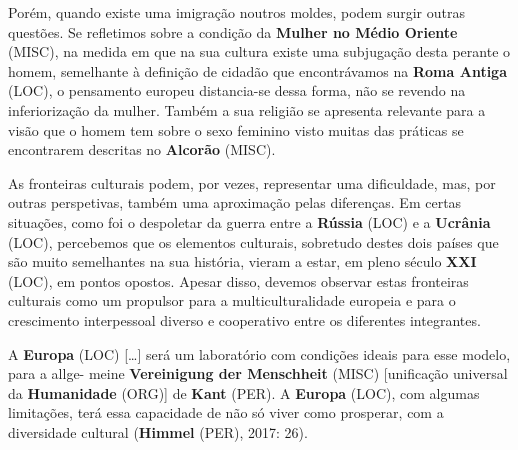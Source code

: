 \documentclass[12pt,a4paper]{article}
\begin{document}
Porém,  quando  existe  uma  imigração  noutros  moldes,  podem  surgir  outras questões. Se refletimos sobre a condição da \textbf{Mulher no Médio Oriente} (MISC), na medida em que na sua cultura existe uma subjugação desta perante o homem, semelhante à definição de cidadão que encontrávamos na \textbf{Roma Antiga} (LOC), o pensamento europeu distancia-se dessa forma, não se revendo na inferiorização da mulher. Também a sua religião se apresenta relevante para a visão que o homem tem sobre o sexo feminino visto muitas das práticas se encontrarem descritas no \textbf{Alcorão} (MISC).

As fronteiras culturais podem, por vezes, representar uma dificuldade, mas, por outras  perspetivas,  também  uma  aproximação  pelas  diferenças.  Em  certas  situações, como  foi  o  despoletar  da  guerra  entre  a  \textbf{Rússia} (LOC)  e  a  \textbf{Ucrânia} (LOC),  percebemos  que  os elementos  culturais,  sobretudo  destes  dois  países  que  são  muito  semelhantes  na  sua história,  vieram  a  estar,  em  pleno  século  \textbf{XXI} (LOC),  em  pontos  opostos.  Apesar  disso, devemos  observar  estas  fronteiras  culturais  como  um  propulsor  para  a multiculturalidade  europeia  e  para  o  crescimento  interpessoal  diverso  e  cooperativo entre os diferentes integrantes.

A \textbf{Europa} (LOC) […] será um laboratório com condições ideais para esse modelo, para a allge- meine \textbf{Vereinigung der Menschheit} (MISC) [unificação universal da \textbf{Humanidade} (ORG)] de \textbf{Kant} (PER). A \textbf{Europa} (LOC), com algumas limitações, terá essa capacidade de não só viver como prosperar, com a diversidade cultural (\textbf{Himmel} (PER), 2017: 26).
\end{document}
